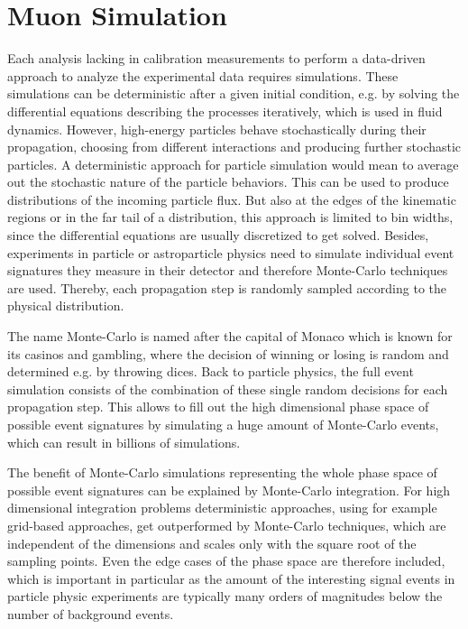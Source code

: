 \chapter{Muon Simulation} \label{sec:simulation}

Each analysis lacking in calibration measurements to perform a data-driven approach to analyze the experimental data requires simulations.
These simulations can be deterministic after a given initial condition, e.g. by solving the differential equations describing the processes iteratively, which is used in fluid dynamics.
However, high-energy particles behave stochastically during their propagation, choosing from different interactions and producing further stochastic particles.
A deterministic approach for particle simulation would mean to average out the stochastic nature of the particle behaviors.
This can be used to produce distributions of the incoming particle flux.
But also at the edges of the kinematic regions or in the far tail of a distribution, this approach is limited to bin widths, since the differential equations are usually discretized to get solved.
Besides, experiments in particle or astroparticle physics need to simulate individual event signatures they measure in their detector and therefore Monte-Carlo techniques are used.
Thereby, each propagation step is randomly sampled according to the physical distribution.

The name Monte-Carlo is named after the capital of Monaco which is known for its casinos and gambling, where the decision of winning or losing is random and determined e.g. by throwing dices.
Back to particle physics, the full event simulation consists of the combination of these single random decisions for each propagation step.
This allows to fill out the high dimensional phase space of possible event signatures by simulating a huge amount of Monte-Carlo events, which can result in billions of simulations.

The benefit of Monte-Carlo simulations representing the whole phase space of possible event signatures can be explained by Monte-Carlo integration.
For high dimensional integration problems deterministic approaches, using for example grid-based approaches, get outperformed by Monte-Carlo techniques, which are independent of the dimensions and scales only with the square root of the sampling points.
Even the edge cases of the phase space are therefore included, which is important in particular as the amount of the interesting signal events in particle physic experiments are typically many orders of magnitudes below the number of background events.


